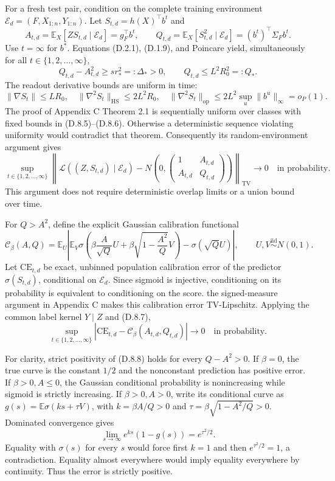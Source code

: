 \documentclass[
  11pt,
  a4paper,
]{article}
\begin{document}
For a fresh test pair, condition on the complete training environment
\(\mathcal E_d=(F,X_{1:n},Y_{1:n})\). Let \(S_{t,d}=h(X)^\top b^t\) and
\[
A_{t,d}=\mathbb E_X[ZS_{t,d}\mid\mathcal E_d]=g_F^\top b^t,
\qquad
Q_{t,d}=\mathbb E_X[S_{t,d}^2\mid\mathcal E_d]=(b^t)^\top\Sigma_Fb^t.
\tag{D.8.4}
\] Use \(t=\infty\) for \(b^*\). Equations (D.2.1), (D.1.9), and
Poincare yield, simultaneously for all \(t\in\{1,2,\ldots,\infty\}\), \[
Q_{t,d}-A_{t,d}^2\geq s r_*^2=:\Delta_*>0,
\qquad Q_{t,d}\leq L^2R_0^2=:Q_*.
\tag{D.8.5}
\] The readout derivative bounds are uniform in time: \[
\|\nabla S_t\|\leq LR_0,\quad
\|\nabla^2S_t\|_{\mathrm{HS}}\leq2L^2R_0,\quad
\|\nabla^2S_t\|_{\mathrm{op}}
\leq2L^2\sup_u\|b^u\|_\infty=o_P(1).
\tag{D.8.6}
\] The proof of Appendix C Theorem 2.1 is sequentially uniform over
classes with fixed bounds in (D.8.5)--(D.8.6). Otherwise a deterministic
sequence violating uniformity would contradict that theorem.
Consequently its random-environment argument gives \[
\sup_{t\in\{1,2,\ldots,\infty\}}
\left\|\mathcal L((Z,S_{t,d})\mid\mathcal E_d)
-N\!\left(0,\begin{pmatrix}1&A_{t,d}\\A_{t,d}&Q_{t,d}\end{pmatrix}\right)
\right\|_{\mathrm{TV}}\longrightarrow0
\quad\text{in probability}.
\tag{D.8.7}
\] This argument does not require deterministic overlap limits or a
union bound over time.

For \(Q>A^2\), define the explicit Gaussian calibration functional \[
\mathcal C_\beta(A,Q)
=\mathbb E_{U}\left|
\mathbb E_V\sigma\!\left(\beta\frac{A}{\sqrt Q}U
+\beta\sqrt{1-\frac{A^2}{Q}}V\right)
-\sigma(\sqrt Q U)\right|,
\qquad U,V\stackrel{\mathrm{iid}}\sim N(0,1).
\tag{D.8.8}
\] Let \(\mathrm{CE}_{t,d}\) be exact, unbinned population calibration
error of the predictor \(\sigma(S_{t,d})\), conditional on
\(\mathcal E_d\). Since sigmoid is injective, conditioning on its
probability is equivalent to conditioning on the score. the
signed-measure argument in Appendix C makes this calibration error
TV-Lipschitz. Applying the common label kernel \(Y\mid Z\) and (D.8.7),
\[
\sup_{t\in\{1,2,\ldots,\infty\}}
|\mathrm{CE}_{t,d}-\mathcal C_\beta(A_{t,d},Q_{t,d})|
\longrightarrow0
\quad\text{in probability}.
\tag{D.8.9}
\]

For clarity, strict positivity of (D.8.8) holds for every \(Q-A^2>0\).
If \(\beta=0\), the true curve is the constant \(1/2\) and the
nonconstant prediction has positive error. If \(\beta>0,A\leq0\), the
Gaussian conditional probability is nonincreasing while sigmoid is
strictly increasing. If \(\beta>0,A>0\), write its conditional curve as
\(g(s)=\mathbb E\sigma(ks+\tau V)\), with \(k=\beta A/Q>0\) and
\(\tau=\beta\sqrt{1-A^2/Q}>0\). Dominated convergence gives \[
\lim_{s\to\infty}e^{ks}(1-g(s))=e^{\tau^2/2}.
\] Equality with \(\sigma(s)\) for every \(s\) would force first \(k=1\)
and then \(e^{\tau^2/2}=1\), a contradiction. Equality almost everywhere
would imply equality everywhere by continuity. Thus the error is
strictly positive.
\end{document}
